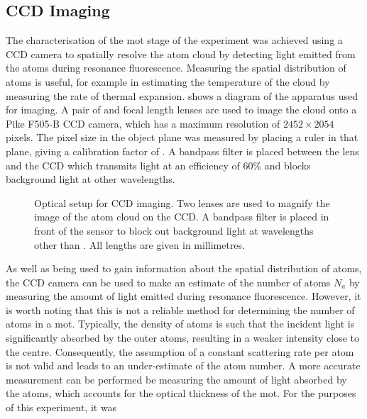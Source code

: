\subsection{CCD Imaging}\label{sec:imaging}
The characterisation of the \ac{mot} stage of the experiment was achieved using
a CCD camera to spatially resolve the atom cloud by detecting light emitted from
the atoms during resonance fluorescence. Measuring the spatial distribution of
atoms is useful, for example in estimating the temperature of the cloud by
measuring the rate of thermal expansion.  shows a
diagram of the apparatus used for imaging. A pair of 
and  focal length lenses are used to image the cloud
onto a Pike F505-B CCD camera, which has a maximum resolution of \(2452 \times
2054\) pixels. The pixel size in the object plane was measured by placing a
ruler in that plane, giving a calibration factor of
. A bandpass filter is placed between the
lens and the CCD which transmits  light at an
efficiency of 60\% and blocks background light at other wavelengths.
\begin{figure}[!htbp]
	\centering
	\def\svgwidth{0.6\textwidth}
	
	\caption[Optical setup for CCD imaging]{Optical setup for CCD imaging. Two
		lenses are used to magnify the image of the atom cloud on the CCD. A
		bandpass filter is placed in front of the sensor to block out background
		light at wavelengths other than
		. All lengths are given in millimetres.}
	\label{fig:imaging_optics}
\end{figure}
\par\noindent As well as being used to gain information about the spatial
distribution of atoms, the CCD camera can be used to make an estimate of the
number of atoms \(N_a\) by measuring the amount of light emitted during
resonance fluorescence. However, it is worth noting that this is not a reliable
method for determining the number of atoms in a \ac{mot}. Typically, the density
of atoms is such that the incident light is significantly absorbed by the outer
atoms, resulting in a weaker intensity close to the centre. Consequently, the
assumption of a constant scattering rate per atom is not valid and leads to an
under-estimate of the atom number. A more accurate measurement can be performed
be measuring the amount of light absorbed by the atoms, which accounts for the
optical thickness of the \ac{mot}. For the purposes of this experiment, it was

